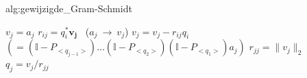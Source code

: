 \begin{alg}{alg:gewijzigde_Gram-Schmidt}
    \vspace{-0.3cm}
    \begin{tcolorbox}[colback=white, colframe=gray, arc=0mm] 
        \begin{algorithmic}[1]
            \State $v_j = a_j$
                \State $r_{ij} = q_i^* \boldsymbol{v_j}$ \ ($a_j \ \rightarrow \ v_j$)
                \State $v_j = v_j - r_{ij} q_i$ \ $(= (\mathbb{I} - P_{<q_{j - 1}>})\ldots(\mathbb{I} - P_{<q_{2}>})(\mathbb{I} - P_{<q_{1}>})a_j)$
            \EndFor
            \State $r_{jj} = \|v_j\|_2$
            \State $q_j = v_j / r_{jj}$
        \EndFor
        \end{algorithmic}
    \end{tcolorbox}
    \vspace{-0.3cm}
\end{alg}

